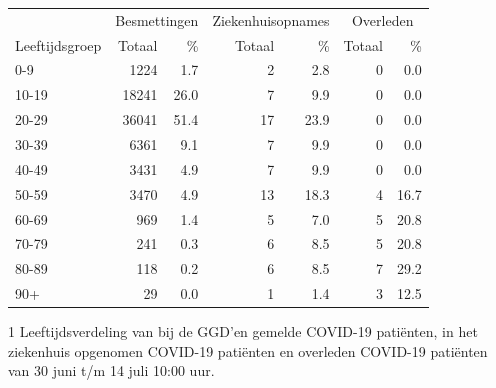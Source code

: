 \documentclass[
  english,
  man,floatsintext]{apa6}
\begin{document}
\begin{table}
\centering\begingroup\fontsize{11}{13}\selectfont

\begin{threeparttable}
\begin{tabular}{lrrrrrr}
\toprule
\multicolumn{1}{c}{ } & \multicolumn{2}{c}{Besmettingen} & \multicolumn{2}{c}{Ziekenhuisopnames} & \multicolumn{2}{c}{Overleden} \\
\cmidrule(l{3pt}r{3pt}){2-3} \cmidrule(l{3pt}r{3pt}){4-5} \cmidrule(l{3pt}r{3pt}){6-7}
Leeftijdsgroep & Totaal & \% & Totaal & \% & Totaal & \%\\
\midrule
0-9 & 1224 & 1.7 & 2 & 2.8 & 0 & 0.0\\
10-19 & 18241 & 26.0 & 7 & 9.9 & 0 & 0.0\\
20-29 & 36041 & 51.4 & 17 & 23.9 & 0 & 0.0\\
30-39 & 6361 & 9.1 & 7 & 9.9 & 0 & 0.0\\
40-49 & 3431 & 4.9 & 7 & 9.9 & 0 & 0.0\\
50-59 & 3470 & 4.9 & 13 & 18.3 & 4 & 16.7\\
60-69 & 969 & 1.4 & 5 & 7.0 & 5 & 20.8\\
70-79 & 241 & 0.3 & 6 & 8.5 & 5 & 20.8\\
80-89 & 118 & 0.2 & 6 & 8.5 & 7 & 29.2\\
90+ & 29 & 0.0 & 1 & 1.4 & 3 & 12.5\\
\bottomrule
\end{tabular}
\begin{tablenotes}
\item[1] Leeftijdsverdeling van bij de GGD’en gemelde COVID-19 patiënten, in het ziekenhuis opgenomen COVID-19 patiënten en overleden COVID-19 patiënten van 30 juni t/m 14 juli 10:00 uur.
\end{tablenotes}
\end{threeparttable}
\endgroup{}
\end{table}

\newpage
\end{document}
